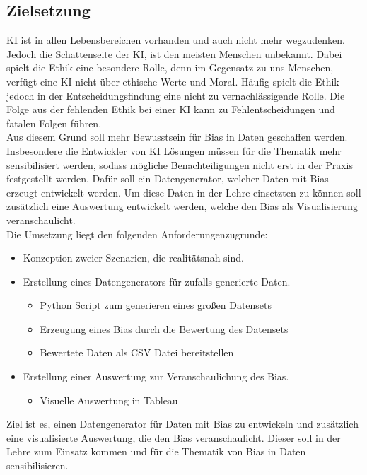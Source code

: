 \begin{onehalfspace}
        \newpage
        \section{Zielsetzung}
        \label{subsec:zielsetzung}
        \ac*{KI} ist in allen Lebensbereichen vorhanden und auch nicht mehr wegzudenken. Jedoch die Schattenseite der \ac*{KI}, ist den meisten Menschen unbekannt. Dabei spielt die Ethik eine besondere Rolle, denn im Gegensatz zu uns Menschen, verfügt eine \ac*{KI} nicht über ethische Werte und Moral. Häufig spielt die Ethik jedoch in der Entscheidungsfindung eine nicht zu vernachlässigende Rolle. Die Folge aus der fehlenden Ethik bei einer \ac*{KI} kann zu Fehlentscheidungen und fatalen Folgen führen.
        \\
        Aus diesem Grund soll mehr Bewusstsein für Bias in Daten geschaffen werden. Insbesondere die Entwickler von \ac*{KI} Lösungen müssen für die Thematik mehr sensibilisiert werden, sodass mögliche Benachteiligungen nicht erst in der Praxis festgestellt werden. Dafür soll ein Datengenerator, welcher Daten mit Bias erzeugt entwickelt werden. Um diese Daten in der Lehre einsetzten zu können soll zusätzlich eine Auswertung entwickelt werden, welche den Bias als Visualisierung veranschaulicht. 
        \\
        Die Umsetzung liegt den folgenden Anforderungenzugrunde:
        \begin{itemize}
            \item Konzeption zweier Szenarien, die realitätsnah sind.
            \item Erstellung eines Datengenerators für zufalls generierte Daten. 
            \begin{itemize}
                \item Python Script zum generieren eines großen Datensets
                \item Erzeugung eines Bias durch die Bewertung des Datensets
                \item Bewertete Daten als CSV Datei bereitstellen
            \end{itemize}
            \item Erstellung einer Auswertung zur Veranschaulichung des Bias.
            \begin{itemize}
                \item Visuelle Auswertung in Tableau
            \end{itemize}
        \end{itemize} 
        Ziel ist es, einen Datengenerator für Daten mit Bias zu entwickeln und zusätzlich eine visualisierte Auswertung, die den Bias veranschaulicht. Dieser soll in der Lehre zum Einsatz kommen und für die Thematik von Bias in Daten sensibilisieren.


\end{onehalfspace}
